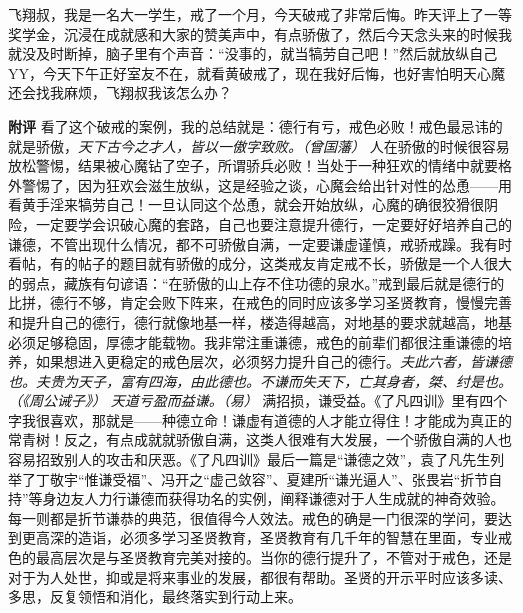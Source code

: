 \begin{case}
    飞翔叔，我是一名大一学生，戒了一个月，今天破戒了非常后悔。昨天评上了一等奖学金，沉浸在成就感和大家的赞美声中，有点骄傲了，然后今天念头来的时候我就没及时断掉，脑子里有个声音：“没事的，就当犒劳自己吧！”然后就放纵自己 YY，今天下午正好室友不在，就看黄破戒了，现在我好后悔，也好害怕明天心魔还会找我麻烦，飞翔叔我该怎么办？

    \textbf{附评} 看了这个破戒的案例，我的总结就是：德行有亏，戒色必败！戒色最忌讳的就是骄傲，\textit{天下古今之才人，皆以一傲字致败。（曾国藩）} 人在骄傲的时候很容易放松警惕，结果被心魔钻了空子，所谓骄兵必败！当处于一种狂欢的情绪中就要格外警惕了，因为狂欢会滋生放纵，这是经验之谈，心魔会给出针对性的怂恿——用看黄手淫来犒劳自己！一旦认同这个怂恿，就会开始放纵，心魔的确很狡猾很阴险，一定要学会识破心魔的套路，自己也要注意提升德行，一定要好好培养自己的谦德，不管出现什么情况，都不可骄傲自满，一定要谦虚谨慎，戒骄戒躁。我有时看帖，有的帖子的题目就有骄傲的成分，这类戒友肯定戒不长，骄傲是一个人很大的弱点，藏族有句谚语：“在骄傲的山上存不住功德的泉水。”戒到最后就是德行的比拼，德行不够，肯定会败下阵来，在戒色的同时应该多学习圣贤教育，慢慢完善和提升自己的德行，德行就像地基一样，楼造得越高，对地基的要求就越高，地基必须足够稳固，厚德才能载物。我非常注重谦德，戒色的前辈们都很注重谦德的培养，如果想进入更稳定的戒色层次，必须努力提升自己的德行。\textit{夫此六者，皆谦德也。夫贵为天子，富有四海，由此德也。不谦而失天下，亡其身者，桀、纣是也。（《周公诫子》）} \textit{天道亏盈而益谦。（易）} 满招损，谦受益。《了凡四训》里有四个字我很喜欢，那就是——种德立命！谦虚有道德的人才能立得住！才能成为真正的常青树！反之，有点成就就骄傲自满，这类人很难有大发展，一个骄傲自满的人也容易招致别人的攻击和厌恶。《了凡四训》最后一篇是“谦德之效”，袁了凡先生列举了丁敬宇“惟谦受福”、冯开之“虚己敛容”、夏建所“谦光逼人”、张畏岩“折节自持”等身边友人力行谦德而获得功名的实例，阐释谦德对于人生成就的神奇效验。每一则都是折节谦恭的典范，很值得今人效法。戒色的确是一门很深的学问，要达到更高深的造诣，必须多学习圣贤教育，圣贤教育有几千年的智慧在里面，专业戒色的最高层次是与圣贤教育完美对接的。当你的德行提升了，不管对于戒色，还是对于为人处世，抑或是将来事业的发展，都很有帮助。圣贤的开示平时应该多读、多思，反复领悟和消化，最终落实到行动上来。
\end{case}


